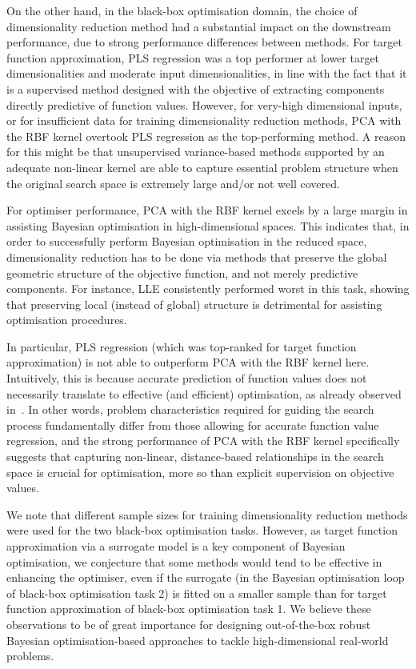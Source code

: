On the other hand, in the black-box optimisation domain, the choice of dimensionality reduction method had a substantial impact on the downstream performance, due to strong performance differences between methods.
For target function approximation, PLS regression was a top performer at lower target dimensionalities and moderate input dimensionalities, in line with the fact that it is a supervised method designed with the objective of extracting components directly predictive of function values.
However, for very-high dimensional inputs, or for insufficient data for training dimensionality reduction methods, PCA with the RBF kernel overtook PLS regression as the top-performing method.
A reason for this might be that unsupervised variance-based methods supported by an adequate non-linear kernel are able to capture essential problem structure when the original search space is extremely large and/or not well covered.


For optimiser performance, PCA with the RBF kernel excels by a large margin in assisting Bayesian optimisation in high-dimensional spaces.
This indicates that, in order to successfully perform Bayesian optimisation in the reduced space, dimensionality reduction has to be done via methods that preserve the global geometric structure of the objective function, and not merely predictive components.
For instance, LLE consistently performed worst in this task, showing that preserving local (instead of global) structure is detrimental for assisting optimisation procedures.


In particular, PLS regression (which was top-ranked for target function approximation) is not able to outperform PCA with the RBF kernel here.
Intuitively, this is because accurate prediction of function values does not necessarily translate to effective (and efficient) optimisation, as already observed in~\citep{FeuEtAl18b}.
In other words, problem characteristics required for guiding the search process fundamentally differ from those allowing for accurate function value regression, and the strong performance of PCA with the RBF kernel specifically suggests that capturing non-linear, distance-based relationships in the search space is crucial for optimisation, more so than explicit supervision on objective values.

We note that different sample sizes for training dimensionality reduction methods were used for the two black-box optimisation tasks.
However, as target function approximation via a surrogate model is a key component of Bayesian optimisation, we conjecture that some methods would tend to be effective in enhancing the optimiser, even if the surrogate (in the Bayesian optimisation loop of black-box optimisation task 2) is fitted on a smaller sample than for target function approximation of  black-box optimisation task 1.
We believe these observations to be of great importance for designing out-of-the-box robust Bayesian optimisation-based approaches to tackle high-dimensional real-world problems.















